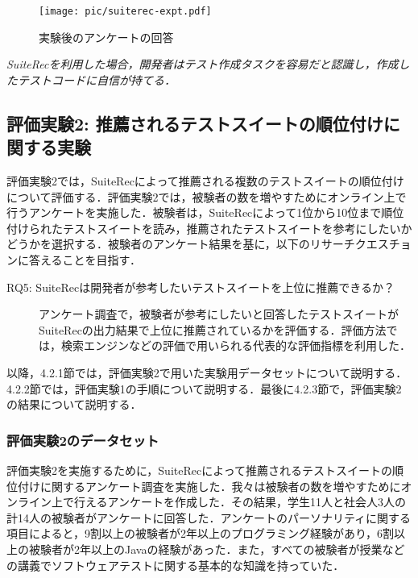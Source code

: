 \documentclass[12pt]{jarticle} %
\begin{document}
\begin{figure}[htbp]
\begin{center}
\texttt{[image: pic/suiterec-expt.pdf]}
\caption{実験後のアンケートの回答}
\label{QA}
\end{center}
\end{figure}

\begin{breakbox}
\textit{{\sf SuiteRec}を利用した場合，開発者はテスト作成タスクを容易だと認識し，作成したテストコードに自信が持てる．}
\end{breakbox}

\subsection{評価実験2: 推薦されるテストスイートの順位付けに関する実験}
評価実験2では，{\sf SuiteRec}によって推薦される複数のテストスイートの順位付けについて評価する．評価実験2では，被験者の数を増やすためにオンライン上で行うアンケートを実施した．被験者は，{\sf SuiteRec}によって1位から10位まで順位付けられたテストスイートを読み，推薦されたテストスイートを参考にしたいかどうかを選択する．被験者のアンケート結果を基に，以下のリサーチクエスチョンに答えることを目指す．

\begin{description}
\item[RQ5: SuiteRecは開発者が参考したいテストスイートを上位に推薦できるか？]
アンケート調査で，被験者が参考にしたいと回答したテストスイートが{\sf SuiteRec}の出力結果で上位に推薦されているかを評価する．評価方法では，検索エンジンなどの評価で用いられる代表的な評価指標を利用した．
\end{description}

以降，4.2.1節では，評価実験2で用いた実験用データセットについて説明する．4.2.2節では，評価実験1の手順について説明する．最後に4.2.3節で，評価実験2の結果について説明する．

\subsubsection{評価実験2のデータセット}
\label{sec:E2data}

評価実験2を実施するために，{\sf SuiteRec}によって推薦されるテストスイートの順位付けに関するアンケート調査を実施した．我々は被験者の数を増やすためにオンライン上で行えるアンケートを作成した．その結果，学生11人と社会人3人の計14人の被験者がアンケートに回答した．アンケートのパーソナリティに関する項目によると，9割以上の被験者が2年以上のプログラミング経験があり，6割以上の被験者が2年以上のJavaの経験があった．また，すべての被験者が授業などの講義でソフトウェアテストに関する基本的な知識を持っていた．
\end{document}

